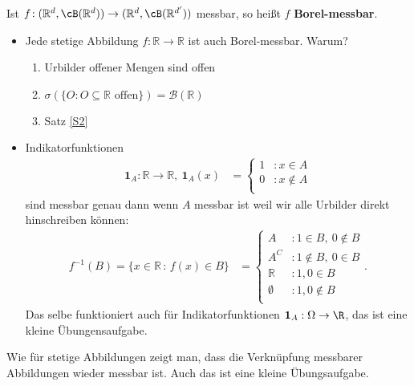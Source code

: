\marginpar{\textcolor{red}{Vorlesung 8}}

\begin{deff}
	Ist $f \! : (\mathbb{R}^d,\cB(\mathbb{R}^d)) \rightarrow (\mathbb{R}^d,\cB(\mathbb{R}^{d'}))$ messbar, so heißt $f$ \textbf{Borel-messbar}.
\end{deff}

\begin{beispiel}\abs
	\begin{itemize}
		\item Jede stetige Abbildung $f \! : \mathbb{R} \rightarrow \mathbb{R}$  ist auch Borel-messbar. Warum?
		\begin{enumerate}[label=(\roman*)]
			\item Urbilder offener Mengen sind offen
			\item $\sigma(\{ O \! : O \subseteq \mathbb{R} \text{ offen} \}) = \mathcal B (\mathbb{R})$
			\item Satz \ref{S2}
		\end{enumerate}
	\item Indikatorfunktionen
	\begin{align*}
		\mathbf 1_A: \mathbb{R} \rightarrow \mathbb{R}, \:  \mathbf{1}_A(x) &= \begin{cases}
		1&: x\in A\\
		0&: x \notin A\\
		\end{cases}
	\end{align*}
	sind messbar genau dann wenn $A$ messbar ist weil wir alle Urbilder direkt hinschreiben k\"onnen:
	\begin{align*}
		f^{-1}(B) = \{ x\in \mathbb{R} \,:\, f(x) \in B \} &= \begin{cases}
		A&: 1 \in B, \: 0 \notin B\\
		A^C&: 1 \notin B, \: 0 \in B\\
		\mathbb{R}&: 1,0 \in B\\
		\emptyset&: 1,0 \notin B\\	
		\end{cases}.
	\end{align*}
	Das selbe funktioniert auch f\"ur Indikatorfunktionen $\mathbf{1}_A:\Omega\to\R$, das ist eine kleine \"Ubungensaufgabe.
	\end{itemize}
\end{beispiel}
Wie f\"ur stetige Abbildungen zeigt man, dass die Verkn\"upfung messbarer Abbildungen wieder messbar ist. Auch das ist eine kleine \"Ubungsaufgabe.
